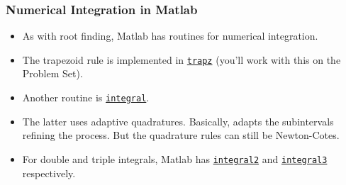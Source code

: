 \documentclass[11pt,xcolor={svgnames},aspectratio=169,usepdftitle=false]{beamer}
\begin{document}
\begin{frame}
  \frametitle{Numerical Integration in Matlab}
\begin{itemize}
  \item As with root finding, Matlab has routines for numerical integration.
  \item The trapezoid rule is implemented in \href{https://www.mathworks.com/help/matlab/ref/trapz.html}{\texttt{trapz}} (you'll work with this on the Problem Set).
  \item Another routine is \href{https://www.mathworks.com/help/matlab/ref/integral.html}{\texttt{integral}}.
  \item The latter uses adaptive quadratures. Basically, adapts the subintervals refining the process. But the quadrature rules can still be Newton-Cotes.
  \item For double and triple integrals, Matlab has \href{https://www.mathworks.com/help/matlab/ref/integral2.html}{\texttt{integral2}} and \href{https://www.mathworks.com/help/matlab/ref/integral3.html}{\texttt{integral3}} respectively.
\end{itemize}
\end{frame}
\end{document}
